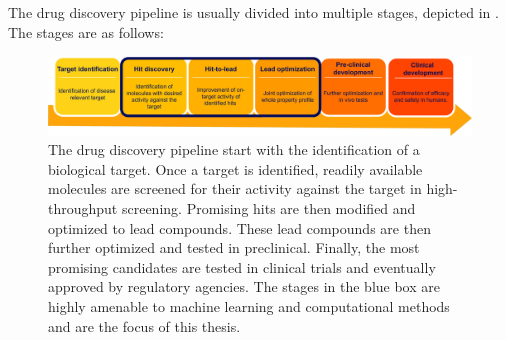 The drug discovery pipeline is usually divided into multiple stages, depicted in
. The stages are as follows:
\begin{figure}
    \centering
    \includegraphics[width=\textwidth]{figures/drug-discovery-pipeline.pdf}
    \caption{The drug discovery pipeline start with the identification of a
    biological target. Once a target is identified, readily available molecules
    are screened for their activity against the target in high-throughput
    screening. Promising hits are then modified and optimized to lead compounds.
    These lead compounds are then further optimized and tested in preclinical.
    Finally, the most promising candidates are tested in clinical trials and
    eventually approved by regulatory agencies. The stages in the blue box are
    highly amenable to machine learning and computational methods and are the
    focus of this thesis. \label{fig:drug-discovery-pipeline}}
\end{figure}
